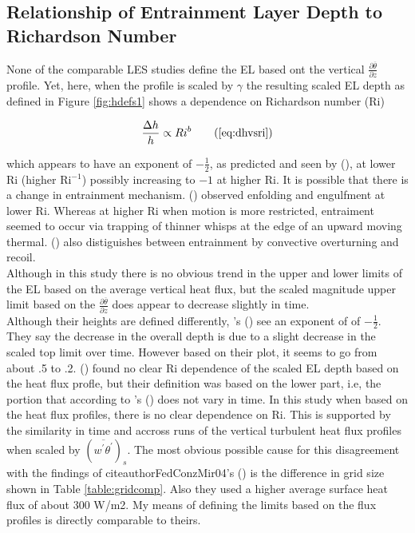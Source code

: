 \subsection{Relationship of Entrainment Layer Depth to Richardson Number}

None of the comparable \acs{LES} studies define the \acs{EL} based ont the vertical $\frac{\partial \overline{\theta}}{\partial z}$ profile.  Yet, here, when the profile is scaled by $\gamma$ the resulting scaled \acs{EL} depth as defined in Figure \ref{fig:hdefs1} shows a dependence on Richardson number (\acs{Ri}) 

\begin{equation}
\frac{\Delta h}{h} \propto Ri ^{b} \tag{\ref{eq:dhvsri}}
\end{equation}


which appears to have an exponent of $-\frac{1}{2}$, as predicted and seen by \citeauthor{Boers89} (\citeyear{Boers89}), at lower \acs{Ri} (higher \acs{Ri}$^{-1}$) possibly increasing to $-1$ at higher \acs{Ri}.  It is possible that there is a change in entrainment mechanism. \citeauthor{SullMoengStev} (\citeyear{SullMoengStev}) observed enfolding and engulfment at lower \acs{Ri}.  Whereas at higher \acs{Ri} when motion is more restricted, entraiment seemed to occur via trapping of thinner whisps at the edge of an upward moving thermal.  \citeauthor{Turner86} (\citeyear{Turner86}) also distiguishes between entrainment by convective overturning and recoil.\\    


Although in this study there is no obvious trend in the upper and lower limits of the \acs{EL} based on the average vertical heat flux, but the scaled magnitude upper limit based on the $\frac{\partial \overline{\theta}}{\partial z}$ does appear to decrease slightly in time.\\


Although their heights are defined differently,  \citeauthor{FedConzMir04}'s (\citeyear{FedConzMir04}) see an exponent of of $-\frac{1}{2}$.  They say the decrease in the overall depth is due to a slight decrease in the scaled top limit over time.  However based on their plot, it seems to go from about .5 to .2. \citeauthor{BrooksFowler2} (\citeyear{BrooksFowler2}) found no clear \acs{Ri} dependence of the scaled \acs{EL} depth based on the heat flux profle, but their definition was based on the lower part, i.e, the portion that according to \citeauthor{FedConzMir04}'s (\citeyear{FedConzMir04}) does not vary in time.  In this study when based on the heat flux profiles, there is no clear dependence on \acs{Ri}. This is supported by the similarity in time and accross runs of the vertical turbulent heat flux profiles when scaled by $(\overline{w^{'}\theta^{'}})_{s}$. The most obvious possible cause for this disagreement with the findings of citeauthor{FedConzMir04}'s (\citeyear{FedConzMir04}) is the difference in grid size shown in Table \ref{table:gridcomp}. Also they used a higher average surface heat flux of about 300 W/m2. My means of defining the limits based on the flux profiles is directly comparable to theirs.\\              

